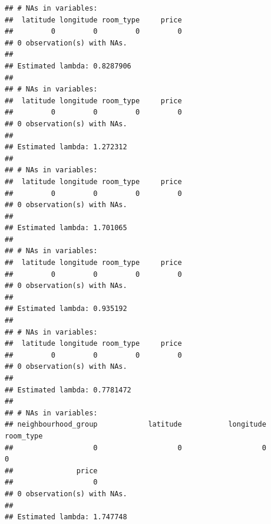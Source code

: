 \documentclass[
]{article}
\begin{document}
\begin{verbatim}
## # NAs in variables:
##  latitude longitude room_type     price 
##         0         0         0         0 
## 0 observation(s) with NAs.
## 
## Estimated lambda: 0.8287906 
## 
## # NAs in variables:
##  latitude longitude room_type     price 
##         0         0         0         0 
## 0 observation(s) with NAs.
## 
## Estimated lambda: 1.272312 
## 
## # NAs in variables:
##  latitude longitude room_type     price 
##         0         0         0         0 
## 0 observation(s) with NAs.
## 
## Estimated lambda: 1.701065 
## 
## # NAs in variables:
##  latitude longitude room_type     price 
##         0         0         0         0 
## 0 observation(s) with NAs.
## 
## Estimated lambda: 0.935192 
## 
## # NAs in variables:
##  latitude longitude room_type     price 
##         0         0         0         0 
## 0 observation(s) with NAs.
## 
## Estimated lambda: 0.7781472 
## 
## # NAs in variables:
## neighbourhood_group            latitude           longitude           room_type 
##                   0                   0                   0                   0 
##               price 
##                   0 
## 0 observation(s) with NAs.
## 
## Estimated lambda: 1.747748
\end{verbatim}
\end{document}
